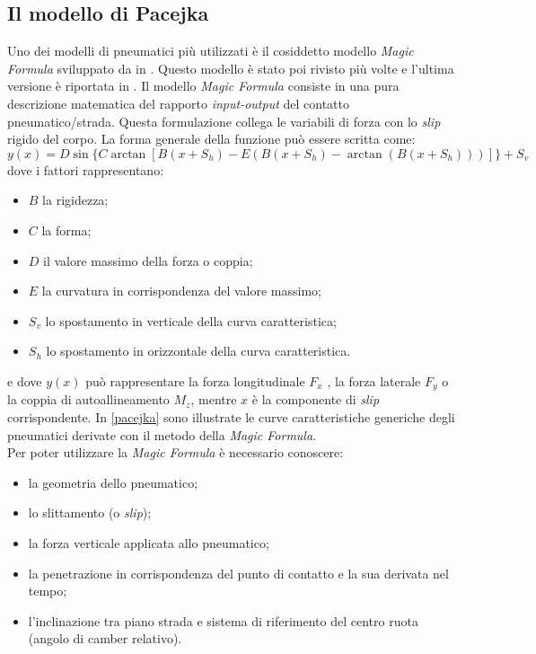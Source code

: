 \subsection{Il modello di Pacejka}
Uno dei modelli di pneumatici più utilizzati è il cosiddetto modello \textit{Magic Formula} sviluppato da \citeauthor{bakker} in \cite{bakker}. Questo modello è stato poi rivisto più volte e l'ultima versione è riportata in \cite{hans}. Il modello \textit{Magic Formula} consiste in una pura descrizione matematica del rapporto \textit{input-output} del contatto pneumatico/strada. Questa formulazione collega le variabili di forza con lo \textit{slip} rigido del corpo. La forma generale della funzione può essere scritta come:
%
\begin{equation}
y(x) = D\sin\{C\arctan[B(x + S_h ) - E(B(x + S_h ) - \arctan(B(x + S_h )))]\} + S_v
\end{equation}
%
dove i fattori rappresentano:
\begin{itemize}
	\item $B$ la rigidezza;
	\item $C$ la forma;
	\item $D$ il valore massimo della forza o coppia;
	\item $E$ la curvatura in corrispondenza del valore massimo;
	\item $S_v$ lo spostamento in verticale della curva caratteristica;
	\item $S_h$ lo spostamento in orizzontale della curva caratteristica.
\end{itemize}
e dove $y(x)$ può rappresentare la forza longitudinale $F_x$ , la forza laterale $F_y$ o la coppia di autoallineamento $M_z$, mentre $x$ è la componente di \textit{slip} corrispondente. In \figurename{ \ref{pacejka}} sono illustrate le curve caratteristiche generiche degli pneumatici derivate con il metodo della \textit{Magic Formula}.\\
Per poter utilizzare la \textit{Magic Formula} è necessario conoscere:
\begin{itemize}
	\item la geometria dello pneumatico;
	\item lo slittamento (o \textit{slip});
	\item la forza verticale applicata allo pneumatico;
	\item la penetrazione in corrispondenza del punto di contatto e la sua derivata nel tempo;
	\item l'inclinazione tra piano strada e sistema di riferimento del centro ruota (angolo di camber relativo).
\end{itemize}
